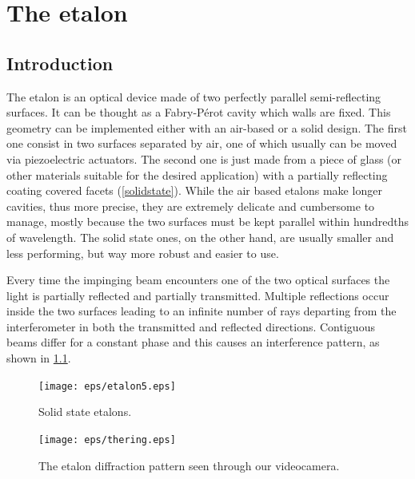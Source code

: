 \chapter{The etalon}\label{etalon}
	\section{Introduction}
The etalon is an optical device made of two perfectly parallel semi-reflecting surfaces. It can be thought as a Fabry-P\'erot cavity which walls are fixed. This geometry can be implemented either with an air-based or a solid design. The first one consist in two surfaces separated by air, one of which usually can be moved via piezoelectric actuators. The second one is just made from a piece of glass (or other materials suitable for the desired application) with a partially reflecting coating covered facets (\cref{solidstate}). While the air based etalons make longer cavities, thus more precise, they are extremely delicate and cumbersome to manage, mostly because the two surfaces must be kept parallel within hundredths of wavelength. The solid state ones, on the other hand, are usually smaller and less performing, but way more robust and easier to use.

Every time the impinging beam encounters one of the two optical surfaces the light is partially reflected and partially transmitted. Multiple reflections occur inside the two surfaces leading to an infinite number of rays departing from the interferometer in both the transmitted and reflected directions. Contiguous beams differ for a constant phase and this causes an interference pattern, as shown in \cref{etalonmonitor}.

\begin{figure}[!hbt]\centering
\begin{minipage}[t]{0.46\textwidth}\centering
\texttt{[image: eps/etalon5.eps]}
\caption{Solid state etalons.}
\label{solidstate}
\end{minipage}
\hfill
\begin{minipage}[t]{0.46\textwidth}\centering
\texttt{[image: eps/thering.eps]}
\caption{The etalon diffraction pattern seen through our videocamera.}
\label{etalonmonitor}
\end{minipage}
\end{figure}

